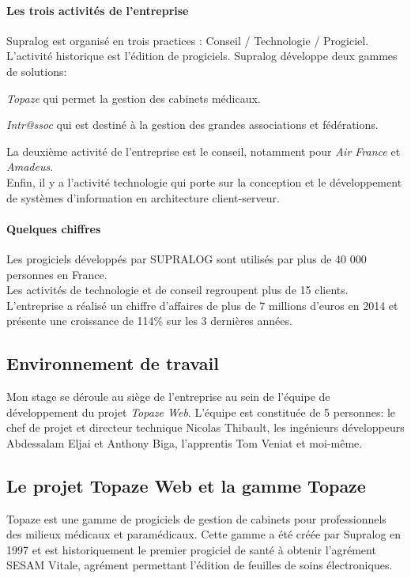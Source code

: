 \paragraph{Les trois activités de l'entreprise\\}
Supralog est organisé en trois practices : Conseil / Technologie / Progiciel.\\
L'activité historique est l'édition de progiciels. Supralog développe deux gammes de solutions:
\begin{sitemize}
\item \textit{Topaze} qui permet la gestion des cabinets médicaux.
\item \textit{Intr@ssoc} qui est destiné à la gestion des grandes associations et fédérations.
\end{sitemize}

La deuxième activité de l'entreprise est le conseil, notamment pour \textit{Air France} et \textit{Amadeus}.\\
Enfin, il y a l'activité technologie qui porte sur la conception et le développement de systèmes d'information en architecture client-serveur. 

\paragraph{Quelques chiffres\\}
Les progiciels développés par SUPRALOG sont utilisés par plus de 40 000 personnes en France.\\
Les activités de technologie et de conseil regroupent plus de 15 clients.\\
L'entreprise a réalisé un chiffre d'affaires de plus de 7 millions d'euros en 2014 et présente une croissance de 114\% sur les 3 dernières années.

\subsection{Environnement de travail}
Mon stage se déroule au siège de l'entreprise au sein de l'équipe de développement du projet \textit{Topaze Web}.
L'équipe est constituée de 5 personnes: le chef de projet et directeur technique Nicolas Thibault, les ingénieurs développeurs Abdessalam Eljai et Anthony Biga, l'apprentis Tom Veniat et moi-même.

\subsection{Le projet Topaze Web et la gamme Topaze}
Topaze est une gamme de progiciels de gestion de cabinets pour professionnels des milieux
médicaux et paramédicaux. Cette gamme a été créée par Supralog en 1997 et est historiquement le
premier progiciel de santé à obtenir l'agrément SESAM Vitale, agrément permettant l’édition de
feuilles de soins électroniques.\\

